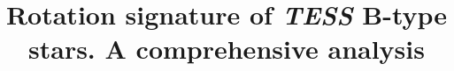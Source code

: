 \documentclass[RNAAS]{aastex63}
\begin{document}
\title{Rotation signature of \textit{TESS}  B-type stars. A comprehensive analysis} 



\end{document}
